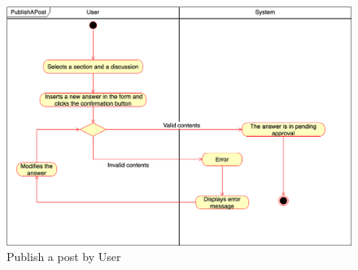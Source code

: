     \begin{figure}[h!]
        \centering
        \includegraphics[scale=0.35]{images/use_cases_diagram/user_publish_post.png}
        \caption{Publish a post by User}
        \label{fig:publish_post_by_user}
    \end{figure}
   \newpage
